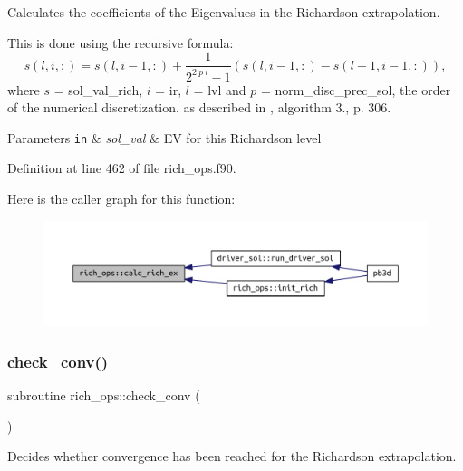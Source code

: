 Calculates the coefficients of the Eigenvalues in the Richardson extrapolation. 

This is done using the recursive formula\+: \[ s(l,i,:) = s(l,i-1,:) + \frac{1}{2^{2 \ p \ i} - 1} (s(l,i-1,:) - s(l-1,i-1,:)), \] where $s$ = {\ttfamily sol\+\_\+val\+\_\+rich}, $i$ = {\ttfamily ir}, $l$ = {\ttfamily lvl} and $p$ = {\ttfamily norm\+\_\+disc\+\_\+prec\+\_\+sol}, the order of the numerical discretization. as described in \cite{dahlquist2003numerical}, algorithm 3., p. 306.


\begin{DoxyParams}[1]{Parameters}
\mbox{\tt in}  & {\em sol\+\_\+val} & EV for this Richardson level \\
\hline
\end{DoxyParams}


Definition at line 462 of file rich\+\_\+ops.\+f90.

Here is the caller graph for this function\+:\nopagebreak
\begin{figure}[H]
\begin{center}
\leavevmode
\includegraphics[width=350pt]{namespacerich__ops_ad2717df0206a397d0d7845a96aa5da23_icgraph}
\end{center}
\end{figure}
\mbox{\label{namespacerich__ops_ac00cce686d45540b238b3b6e39c9bdeb}} 
\subsubsection{\texorpdfstring{check\+\_\+conv()}{check\_conv()}}
{\footnotesize\ttfamily subroutine rich\+\_\+ops\+::check\+\_\+conv (\begin{DoxyParamCaption}{ }\end{DoxyParamCaption})}



Decides whether convergence has been reached for the Richardson extrapolation. 

